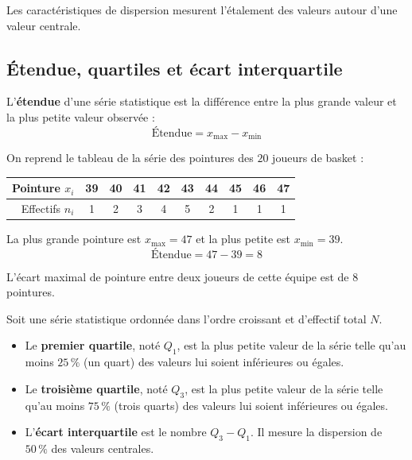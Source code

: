 Les caractéristiques de dispersion mesurent l'étalement des valeurs autour d'une valeur centrale.

\subsection{Étendue, quartiles et écart interquartile}

\begin{defin}[Étendue]
	L'\textbf{étendue} d'une série statistique est la différence entre la plus grande valeur et la plus petite valeur observée :
	\[
		\text{Étendue} = x_{\max} - x_{\min}
	\]
\end{defin}

\begin{ex}
	On reprend le tableau de la série des pointures des $20$ joueurs de basket :

	\begin{center}
		\begin{tabular}{|r|c|c|c|c|c|c|c|c|c|} \hline
			\rowcolor{gray!30} Pointure $x_i$ & 39 & 40 & 41 & 42 & 43 & 44 & 45 & 46 & 47 \\ \hline
			Effectifs $n_i$                   & 1  & 2  & 3  & 4  & 5  & 2  & 1  & 1  & 1  \\ \hline
		\end{tabular}
	\end{center}

	La plus grande pointure est $x_{\max} = 47$ et la plus petite est $x_{\min} = 39$.
	\[
		\text{Étendue} = 47 - 39 = 8
	\]

	L'écart maximal de pointure entre deux joueurs de cette équipe est de $8$ pointures.
\end{ex}

\begin{defin}[Quartiles]
	Soit une série statistique ordonnée dans l'ordre croissant et d'effectif total $N$.
	\begin{itemize}
		\item Le \textbf{premier quartile}, noté $Q_1$, est la plus petite valeur de la série telle qu'au moins $25\,\%$ (un quart) des valeurs lui soient inférieures ou égales.
		\item Le \textbf{troisième quartile}, noté $Q_3$, est la plus petite valeur de la série telle qu'au moins $75\,\%$ (trois quarts) des valeurs lui soient inférieures ou égales.
		\item L'\textbf{écart interquartile} est le nombre $Q_3 - Q_1$. Il mesure la dispersion de $50\,\%$ des valeurs centrales.
	\end{itemize}
\end{defin}

